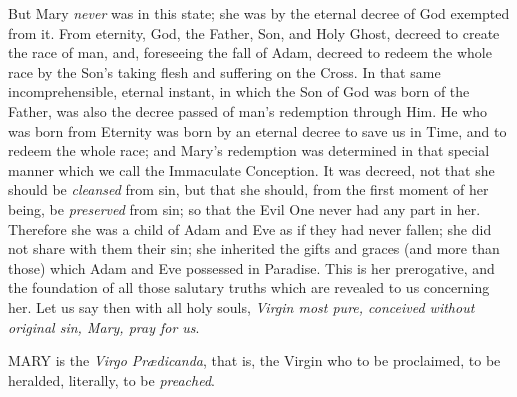 But Mary \emph{never} was in
this state; she was by the eternal decree of God exempted from it. From
eternity, God, the Father, Son, and Holy Ghost, decreed to create the
race of man, and, foreseeing the fall of Adam, decreed to redeem the
whole race by the Son's taking flesh and suffering on the Cross. In that
same incomprehensible, eternal instant, in which the Son of God was born
of the Father, was also the decree passed of man's redemption through
Him. He who was born from Eternity was born by an eternal decree to save
us in Time, and to redeem the whole race; and Mary's redemption was
determined in that special manner which we call the Immaculate
Conception. It was decreed, not that she should be \emph{cleansed} from
sin, but that she should, from the first moment of her being, be \emph{preserved}
from sin; so that the Evil One never had any part in her. Therefore she
was a child of Adam and Eve as if they had never fallen; she did not
share with them their sin; she inherited the gifts and graces (and more
than those) which Adam and Eve possessed in Paradise. This is her
prerogative, and the foundation of all those salutary truths which are
revealed to us concerning her. Let us say then with all holy souls, \emph{Virgin
most pure, conceived without original sin, Mary, pray for us}.



MARY
is the \emph{Virgo Prædicanda}, that is, the Virgin who to be
proclaimed, to be heralded, literally, to be \emph{preached}.

